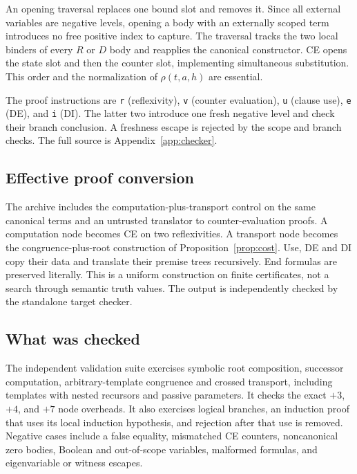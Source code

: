 \documentclass[11pt,letterpaper]{article}
\theoremstyle{definition}
\newcommand{\code}[1]{\texttt{#1}}
\begin{document}
An opening traversal replaces one bound slot and removes it. Since
all external variables are negative levels, opening a body with an
externally scoped term introduces no free positive index to capture.
The traversal tracks the two local binders of every $R$ or $D$ body
and reapplies the canonical constructor. CE opens the state slot and
then the counter slot, implementing simultaneous substitution.
This order and the normalization of $\rho(t,a,h)$ are essential.

The proof instructions are \code{r} (reflexivity), \code{v}
(counter evaluation), \code{u} (clause use), \code{e} (DE), and
\code{i} (DI). The latter two introduce one fresh negative level
and check their branch conclusion. A freshness escape is rejected by
the scope and branch checks. The full source is Appendix~\ref{app:checker}.

\subsection{Effective proof conversion}

The archive includes the computation-plus-transport control on the
same canonical terms and an untrusted translator to counter-evaluation
proofs. A computation node becomes CE on two reflexivities. A transport
node becomes the congruence-plus-root construction of
Proposition~\ref{prop:cost}. Use, DE and DI copy their data and translate
their premise trees recursively. End formulas are preserved literally.
This is a uniform construction on finite certificates, not a search
through semantic truth values. The output is independently checked
by the standalone target checker.

\subsection{What was checked}

The independent validation suite exercises symbolic root composition,
successor computation, arbitrary-template congruence and crossed
transport, including templates with nested recursors and passive
parameters. It checks the exact $+3$, $+4$, and $+7$ node overheads.
It also exercises logical branches, an induction proof that uses its
local induction hypothesis, and rejection after that use is removed.
Negative cases include a false equality, mismatched CE counters,
noncanonical zero bodies, Boolean and out-of-scope variables,
malformed formulas, and eigenvariable or witness escapes.
\end{document}
